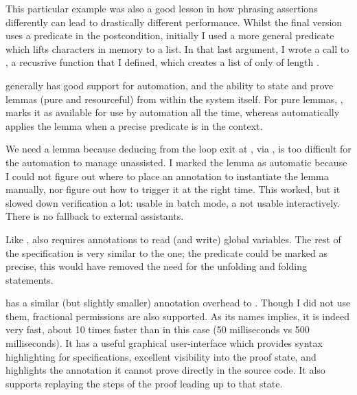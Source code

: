 
This particular example was also a good lesson in how phrasing assertions
differently can lead to drastically different performance. Whilst the final
version uses a  predicate in the postcondition,
initially I used a more general  predicate which lifts
characters in memory to a list. In that last argument, I wrote a call to
, a recusrive function that I %
defined, which creates a list of only  of length
.


 generally has good support for automation, and the ability to
state and prove lemmas (pure and resourceful) from within the system itself.
For pure lemmas, , marks it as available for use by
automation all the time, whereas  automatically
applies the lemma when a precise predicate  is in the context.

We need a lemma because deducing  %
from the loop exit at , via , %
is too difficult for the automation to manage unassisted. I marked the lemma
as automatic because I could not figure out where to place an annotation to
instantiate the lemma manually, nor figure out how to trigger it at the right
time. This worked, but it slowed down verification a lot: usable in
batch mode, a not usable interactively. There is no fallback to external
assistants.


Like ,  also requires annotations to read (and write)
global variables. The rest of the specification is very similar to the 
one; the  predicate could be marked as precise, this would
have removed the need for the unfolding and folding statements.


 has a similar (but slightly smaller) annotation overhead to
\@. Though I did not use them, fractional permissions are also
supported. As its names implies, it is indeed very fast, about 10 times faster
than  in this case (50 milliseconds vs 500 milliseconds). It has a
useful graphical user-interface which provides syntax highlighting for
specifications, excellent visibility into the proof state, and highlights the
annotation it cannot prove directly in the source code. It also
supports replaying the steps of the proof leading up to that state.

